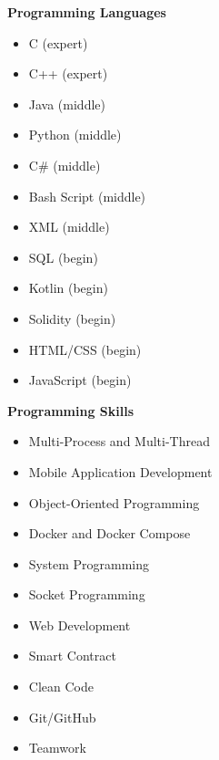 \documentclass[a4paper,11pt]{article}
\begin{document}
\noindent
\begin{minipage}[t]{0.48\textwidth}
    \textbf{Programming Languages}
    \vspace{0.3em}
    \begin{itemize}[leftmargin=2em]
        \item C (expert)
        \item C++ (expert)
        \item Java (middle)
        \item Python (middle)
        \item C\# (middle)
        \item Bash Script (middle)
        \item XML (middle)
        \item SQL (begin)
        \item Kotlin (begin)
        \item Solidity (begin)
        \item HTML/CSS (begin)
        \item JavaScript (begin)
    \end{itemize}
\end{minipage}%
\hfill
\begin{minipage}[t]{0.48\textwidth}
    \textbf{Programming Skills}
    \vspace{0.3em}
    \begin{itemize}[leftmargin=2em]
        \item Multi-Process and Multi-Thread
        \item Mobile Application Development
        \item Object-Oriented Programming
        \item Docker and Docker Compose
        \item System Programming
        \item Socket Programming
        \item Web Development
        \item Smart Contract
        \item Clean Code
        \item Git/GitHub
        \item Teamwork
    \end{itemize}
\end{minipage}
\end{document}
